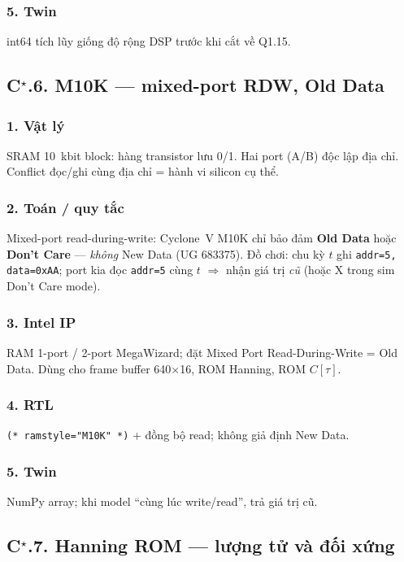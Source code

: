 \subsubsection*{5. Twin} int64 tích lũy giống độ rộng DSP trước khi cắt về Q1.15.

\subsection*{C$^\star$.6. M10K --- mixed-port RDW, Old Data}

\subsubsection*{1. Vật lý}
SRAM 10~kbit block: hàng transistor lưu 0/1. Hai port (A/B) độc lập địa chỉ. Conflict đọc/ghi cùng địa chỉ = hành vi silicon cụ thể.

\subsubsection*{2. Toán / quy tắc}
Mixed-port read-during-write: Cyclone~V M10K chỉ bảo đảm \textbf{Old Data} hoặc \textbf{Don't Care} --- \emph{không} New Data (UG 683375). Đồ chơi: chu kỳ $t$ ghi \texttt{addr=5, data=0xAA}; port kia đọc \texttt{addr=5} cùng $t$ $\Rightarrow$ nhận giá trị \emph{cũ} (hoặc X trong sim Don't Care mode).

\subsubsection*{3. Intel IP}
RAM 1-port / 2-port MegaWizard; đặt Mixed Port Read-During-Write = Old Data. Dùng cho frame buffer 640$\times$16, ROM Hanning, ROM $C[\tau]$.

\subsubsection*{4. RTL} \texttt{(* ramstyle="M10K" *)} + đồng bộ read; không giả định New Data.

\subsubsection*{5. Twin} NumPy array; khi model ``cùng lúc write/read'', trả giá trị cũ.

\subsection*{C$^\star$.7. Hanning ROM --- lượng tử và đối xứng}

